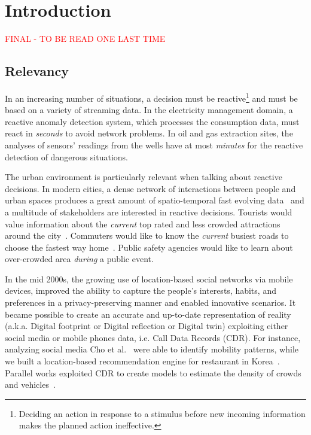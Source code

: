 \chapter{Introduction}\label{ch:intro}

\textcolor{red}{FINAL - TO BE READ ONE LAST TIME}

\section{Relevancy}\label{sec:relevancy}
In an increasing number of situations, a decision must be reactive\footnote{Deciding an action in response to a stimulus before new incoming information makes the planned action ineffective.} and must be based on a variety of streaming data.
In the electricity management domain, a reactive anomaly detection system, which processes the consumption data, must react in \textit{seconds} to avoid network problems. In oil and gas extraction sites, the analyses of sensors' readings from the wells have at most \textit{minutes} for the reactive detection of dangerous situations.

The urban environment is particularly relevant when talking about reactive decisions. In modern cities, a dense network of interactions between people and urban spaces produces a great amount of spatio-temporal fast evolving data~\cite{kitchin2014real} and a multitude of stakeholders are interested in reactive decisions. 
Tourists would value information about the \textit{current} top rated and less crowded attractions around the city~\cite{DBLP:journals/ws/BalduiniCDVHLKT12}. Commuters would like to know the \textit{current} busiest roads to choose the fastest way home~\cite{DBLP:journals/ws/LecueTHTBST14}. Public safety agencies would like to learn about over-crowded area \textit{during} a public event.

In the mid 2000s, the growing use of location-based social networks via mobile devices, improved the ability to capture the people's interests, habits, and preferences in a privacy-preserving manner and enabled innovative scenarios.
It became possible to create an accurate and up-to-date representation of reality (a.k.a. Digital footprint or Digital reflection or Digital twin) exploiting either social media or mobile phones data, i.e. Call Data Records (CDR). 
For instance, analyzing social media Cho et al.~\cite{cho2011friendship} were able to identify mobility patterns, while we built a location-based recommendation engine for restaurant in Korea~\cite{DBLP:conf/semweb/BalduiniVDTPC13}.
Parallel works exploited CDR to create models to estimate the density of crowds and vehicles~\cite{eagle2006reality,becker2011tale,calabrese2011real}.

